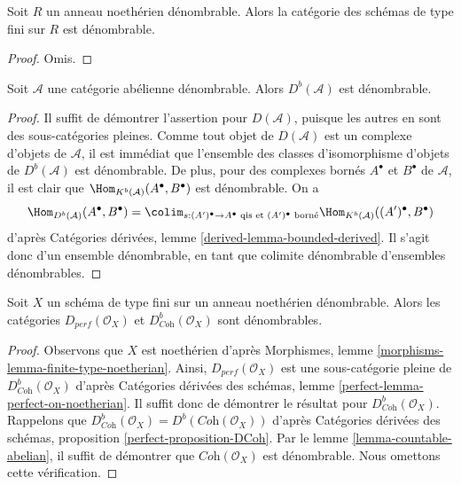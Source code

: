 \begin{lemma}
\label{lemma-countable-finite-type}
Soit $R$ un anneau noethérien dénombrable. Alors la catégorie des schémas de type
fini sur $R$ est dénombrable.
\end{lemma}

\begin{proof}
Omis.
\end{proof}

\begin{lemma}
\label{lemma-countable-abelian}
Soit $\mathcal{A}$ une catégorie abélienne dénombrable.
Alors $D^b(\mathcal{A})$ est dénombrable.
\end{lemma}

\begin{proof}
Il suffit de démontrer l'assertion pour $D(\mathcal{A})$, puisque les autres
en sont des sous-catégories pleines. Comme tout objet de $D(\mathcal{A})$
est un complexe d'objets de $\mathcal{A}$, il est immédiat que l'ensemble des
classes d'isomorphisme d'objets de $D^b(\mathcal{A})$ est dénombrable.
De plus, pour des complexes bornés $A^\bullet$ et $B^\bullet$ de $\mathcal{A}$,
il est clair que $\Hom_{K^b(\mathcal{A})}(A^\bullet, B^\bullet)$ est dénombrable.
On a
$$
\Hom_{D^b(\mathcal{A})}(A^\bullet, B^\bullet) =
\colim_{s : (A')^\bullet \to A^\bullet
\text{ qis et }(A')^\bullet\text{ borné}}
\Hom_{K^b(\mathcal{A})}((A')^\bullet, B^\bullet)
$$
d'après Catégories dérivées, lemme \ref{derived-lemma-bounded-derived}.
Il s'agit donc d'un ensemble dénombrable, en tant que colimite dénombrable d'ensembles dénombrables.
\end{proof}

\begin{lemma}
\label{lemma-countable-perfect}
Soit $X$ un schéma de type fini sur un anneau noethérien dénombrable.
Alors les catégories $D_{perf}(\mathcal{O}_X)$ et
$D^b_{\textit{Coh}}(\mathcal{O}_X)$ sont dénombrables.
\end{lemma}

\begin{proof}
Observons que $X$ est noethérien d'après
Morphismes, lemme \ref{morphisms-lemma-finite-type-noetherian}.
Ainsi, $D_{perf}(\mathcal{O}_X)$ est une sous-catégorie pleine de
$D^b_{\textit{Coh}}(\mathcal{O}_X)$ d'après
Catégories dérivées des schémas, lemme \ref{perfect-lemma-perfect-on-noetherian}.
Il suffit donc de démontrer
le résultat pour $D^b_{\textit{Coh}}(\mathcal{O}_X)$.
Rappelons que
$D^b_{\textit{Coh}}(\mathcal{O}_X) = D^b(\textit{Coh}(\mathcal{O}_X))$
d'après
Catégories dérivées des schémas, proposition \ref{perfect-proposition-DCoh}.
Par le lemme \ref{lemma-countable-abelian},
il suffit de démontrer que $\textit{Coh}(\mathcal{O}_X)$ est
dénombrable. Nous omettons cette vérification.
\end{proof}

